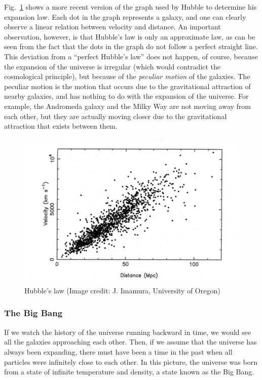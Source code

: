 \documentclass[11pt, a4paper,oneside,openright]{book}
\numberwithin{equation}{section}
\begin{document}
Fig.\ \ref{fig:lec4_9} shows a more recent version of the graph used by Hubble to determine his expansion law. Each dot in the graph represents a galaxy, and one can clearly observe a linear relation between velocity and distance. An important observation, however, is that Hubble's law is only an approximate law, as can be seen from the fact that the dots in the graph do not follow a perfect straight line. This deviation from a ``perfect Hubble's law'' does not happen, of course, because the expansion of the universe is irregular (which would contradict the cosmological principle), but because of the {\it peculiar motion} of the galaxies. The peculiar motion is the motion that occurs due to the gravitational attraction of nearby galaxies, and has nothing to do with the expansion of the universe. For example, the Andromeda galaxy and the Milky Way are not moving away from each other, but they are actually moving closer due to the gravitational attraction that exists between them.
\begin{figure}[ht]
\begin{center}
\includegraphics[scale=0.4]{Draw/lec4_9.png}
\end{center}
\caption{Hubble's law (Image credit: J. Imamura, University of Oregon)}
\label{fig:lec4_9}
\end{figure}

\subsubsection{The Big Bang}

If we watch the history of the universe running backward in time, we would see all the galaxies approaching each other. Then, if we assume that the universe has always been expanding, there must have been a time in the past when all particles were infinitely close to each other. In this picture, the universe was born from a state of infinite temperature and density, a state known as the Big Bang.
\end{document}
